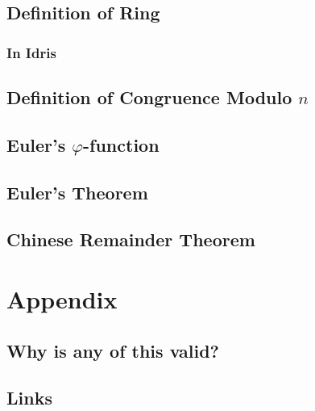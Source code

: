 \documentclass{article}
\begin{document}
\subsection{Definition of Ring}
\subsubsection{In Idris}

\subsection{Definition of Congruence Modulo $n$}

\subsection{Euler's $\varphi$-function}

\subsection{Euler's Theorem}

\subsection{Chinese Remainder Theorem}

\section{}

\section{Appendix}

\subsection{Why is any of this valid?}

\subsection{Links}
\end{document}
